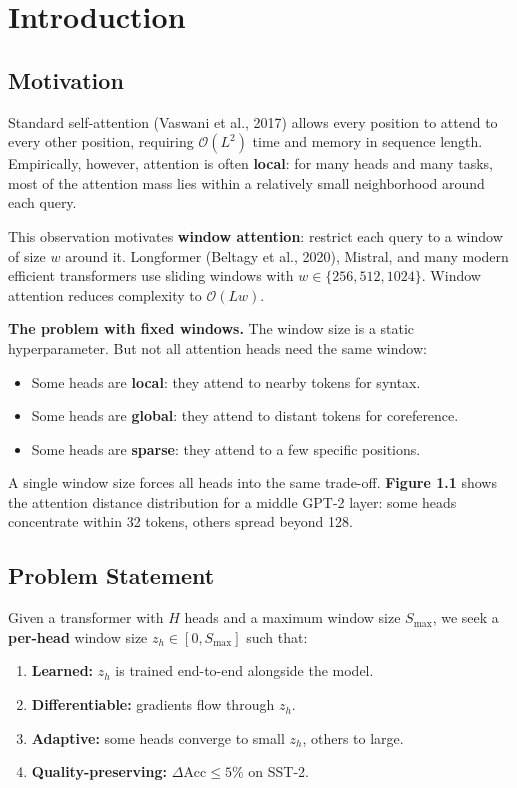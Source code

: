 
\section{Introduction}

\subsection{Motivation}

Standard self-attention (Vaswani et al., 2017) allows every position to attend 
to every other position, requiring $\mathcal{O}(L^2)$ time and memory in 
sequence length. Empirically, however, attention is often \textbf{local}: for many 
heads and many tasks, most of the attention mass lies within a relatively 
small neighborhood around each query.

This observation motivates \textbf{window attention}: restrict each query to a 
window of size $w$ around it. Longformer (Beltagy et al., 2020), Mistral, and 
many modern efficient transformers use sliding windows with $w \in \{256, 
512, 1024\}$. Window attention reduces complexity to $\mathcal{O}(L w)$.

\textbf{The problem with fixed windows.} The window size is a static hyperparameter. 
But not all attention heads need the same window:

\begin{itemize}
\item Some heads are \textbf{local}: they attend to nearby tokens for syntax.
\item Some heads are \textbf{global}: they attend to distant tokens for coreference.
\item Some heads are \textbf{sparse}: they attend to a few specific positions.

\end{itemize}
A single window size forces all heads into the same trade-off. \textbf{Figure 1.1} 
shows the attention distance distribution for a middle GPT-2 layer: some heads 
concentrate within 32 tokens, others spread beyond 128.

\subsection{Problem Statement}

Given a transformer with $H$ heads and a maximum window size $S_\text{max}$, 
we seek a \textbf{per-head} window size $z_h \in [0, S_\text{max}]$ such that:

\begin{enumerate}
\item \textbf{Learned:} $z_h$ is trained end-to-end alongside the model.
\item \textbf{Differentiable:} gradients flow through $z_h$.
\item \textbf{Adaptive:} some heads converge to small $z_h$, others to large.
\item \textbf{Quality-preserving:} $\Delta\text{Acc} \leq 5\%$ on SST-2.

\end{enumerate}
